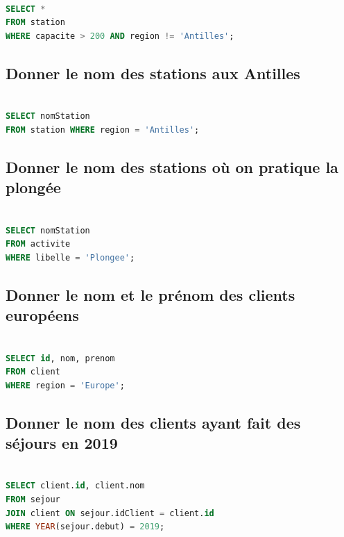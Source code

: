 \documentclass{article}
\begin{document}
\begin{lstlisting}[language=SQL]

SELECT * 
FROM station 
WHERE capacite > 200 AND region != 'Antilles';

\end{lstlisting}

\subsection{Donner le nom des stations aux Antilles}

\begin{lstlisting}[language=SQL]

SELECT nomStation 
FROM station WHERE region = 'Antilles';

\end{lstlisting}

\subsection{Donner le nom des stations où on pratique la plongée}

\begin{lstlisting}[language=SQL]

SELECT nomStation 
FROM activite 
WHERE libelle = 'Plongee';

\end{lstlisting}

\subsection{Donner le nom et le prénom des clients européens}

\begin{lstlisting}[language=SQL]

SELECT id, nom, prenom 
FROM client 
WHERE region = 'Europe';

\end{lstlisting}

\subsection{Donner le nom des clients ayant fait des séjours en 2019}

\begin{lstlisting}[language=SQL]

SELECT client.id, client.nom 
FROM sejour 
JOIN client ON sejour.idClient = client.id 
WHERE YEAR(sejour.debut) = 2019;

\end{lstlisting}
\end{document}
